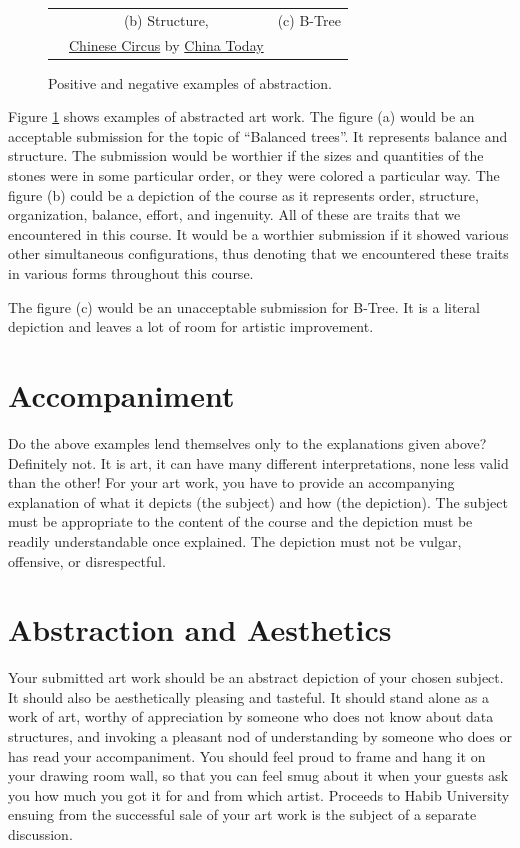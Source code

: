 \documentclass[addpoints]{exam}
\begin{document}
\begin{figure}[h]
\begin{tabular}{ccc}
                                                                                                                                                                                                      & (b) Structure,
    & (c) B-Tree\\
&  \href{https://www.pinterest.co.uk/pin/29132728826423616/}{Chinese Circus} by \href{http://www.chinatoday.com.cn/}{China Today}
  \end{tabular}
  \caption{Positive and negative examples of abstraction.} 
  \label{fig:example}
\end{figure}

Figure \ref{fig:example} shows examples of abstracted art work. The figure (a) would be an acceptable submission for the topic of ``Balanced trees''. It represents balance and structure. The submission would be worthier if the sizes and quantities of the stones were in some particular order, or they were colored a particular way. The figure (b) could be a depiction of the course as it represents order, structure, organization, balance, effort, and ingenuity. All of these are traits that we encountered in this course. It would be a worthier submission if it showed various other simultaneous configurations, thus denoting that we encountered these traits in various forms throughout this course.

The figure (c) would be an unacceptable submission for B-Tree. It is a literal depiction and leaves a lot of room for artistic improvement.

\section*{Accompaniment}

Do the above examples lend themselves only to the explanations given above? Definitely not. It is art, it can have many different interpretations, none less valid than the other! For your art work, you have to provide an accompanying explanation of what it depicts (the subject) and how (the depiction). The subject must be appropriate to the content of the course and the depiction must be readily understandable once explained. The depiction must not be vulgar, offensive, or disrespectful. 

\section*{Abstraction and Aesthetics}

Your submitted art work should be an abstract depiction of your chosen subject. It should also be aesthetically pleasing and tasteful. It should stand alone as a work of art, worthy of appreciation by someone who does not know about data structures, and invoking a pleasant nod of understanding by someone who does or has read your accompaniment. You should feel proud to frame and hang it on your drawing room wall, so that you can feel smug about it when your guests ask you how much you got it for and from which artist. Proceeds to Habib University ensuing from the successful sale of your art work is the subject of a separate discussion.
\end{document}

